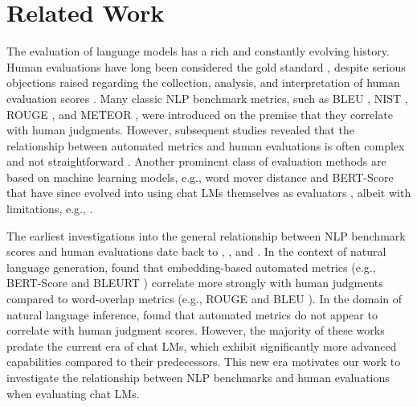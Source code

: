 \section{Related Work}
\label{app:sec:related_work}

The evaluation of language models has a rich and constantly evolving history. Human evaluations have long been considered the gold standard \citep{gatt2018survey,van2019best,celikyilmaz2020evaluation,roller2020opendomainconversationalagentscurrent,van2021human}, despite serious objections raised regarding the collection, analysis, and interpretation of human evaluation scores \citep{novikova2018rankme,howcroft2020twenty, bowman2021fixbenchmarkingnaturallanguage,karpinska2021perilsusingmechanicalturk, clark2021all,smith2022humanevaluationconversationsopen, gehrmann2023repairing,finch2023dontforgetabcsevaluating}. Many classic NLP benchmark metrics, such as BLEU \citep{papineni2002bleu}, NIST \citep{doddington2002nist}, ROUGE \citep{lin2004rouge}, and METEOR \citep{banerjee2005meteor}, were introduced on the premise that they correlate with human judgments. However, subsequent studies revealed that the relationship between automated metrics and human evaluations is often complex and not straightforward \citep{liu2016hownot, novikova2017we, reiter2018structured, karpinska2021perilsusingmechanicalturk}. Another prominent class of evaluation methods are based on machine learning models, e.g., word mover distance \citep{kusner2015word} and BERT-Score \citep{zhang2019bertscore} that have since evolved into using chat LMs themselves as evaluators \citep{wang2023chatgpt,zheng2024judging, chiang2023largelanguagemodelsalternative,chan2023chatevalbetterllmbasedevaluators,bavaresco2024llms,fu2024gptscore}, albeit with limitations, e.g., \citep{dorner2024limits,szymanski2024limitationsllmasajudgeapproachevaluating, thakur2024judging}.

The earliest investigations into the general relationship between NLP benchmark scores and human evaluations date back to \citet{bangalore2000evaluation}, \citet{belz2006comparing}, and \citet{liu2016hownot}. In the context of natural language generation, \citet{clinciu2021study} found that embedding-based automated metrics (e.g., BERT-Score \citep{zhang2019bertscore} and BLEURT \citet{sellam2020bleurt}) correlate more strongly with human judgments compared to word-overlap metrics (e.g., ROUGE \citep{lin2004rouge} and BLEU \citep{papineni2002bleu}). In the domain of natural language inference, \citet{schuff2021does} found that automated metrics do not appear to correlate with human judgment scores. However, the majority of these works predate the current era of chat LMs, which exhibit significantly more advanced capabilities compared to their predecessors. This new era motivates our work to investigate the relationship between NLP benchmarks and human evaluations when evaluating chat LMs.